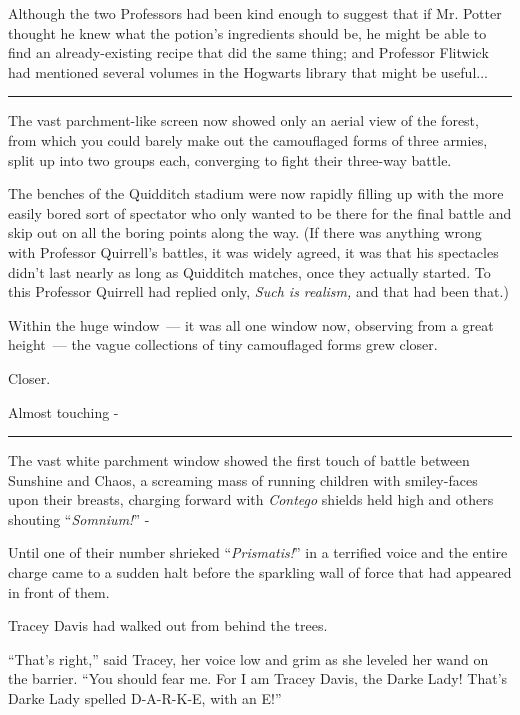 Although the two Professors had been kind enough to suggest that if Mr. Potter thought he knew what the potion's ingredients should be, he might be able to find an already-existing recipe that did the same thing; and Professor Flitwick had mentioned several volumes in the Hogwarts library that might be useful...

\begin{center}\rule{3in}{0.4pt}\end{center}

The vast parchment-like screen now showed only an aerial view of the forest, from which you could barely make out the camouflaged forms of three armies, split up into two groups each, converging to fight their three-way battle.

The benches of the Quidditch stadium were now rapidly filling up with the more easily bored sort of spectator who only wanted to be there for the final battle and skip out on all the boring points along the way. (If there was anything wrong with Professor Quirrell's battles, it was widely agreed, it was that his spectacles didn't last nearly as long as Quidditch matches, once they actually started. To this Professor Quirrell had replied only, \emph{Such is realism,} and that had been that.)

Within the huge window~--- it was all one window now, observing from a great height~--- the vague collections of tiny camouflaged forms grew closer.

Closer.

Almost touching -

\begin{center}\rule{3in}{0.4pt}\end{center}

The vast white parchment window showed the first touch of battle between Sunshine and Chaos, a screaming mass of running children with smiley-faces upon their breasts, charging forward with \emph{Contego} shields held high and others shouting ``\emph{Somnium!}'' -

Until one of their number shrieked ``\emph{Prismatis!}'' in a terrified voice and the entire charge came to a sudden halt before the sparkling wall of force that had appeared in front of them.

Tracey Davis had walked out from behind the trees.

``That's right,'' said Tracey, her voice low and grim as she leveled her wand on the barrier. ``You should fear me. For I am Tracey Davis, the Darke Lady! That's Darke Lady spelled D-A-R-K-E, with an E!''

